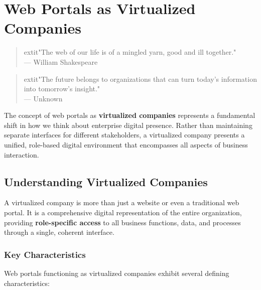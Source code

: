 
\chapter{Web Portals as Virtualized Companies}
\label{chap:virtualized-companies}

\begin{quote}
	extit{"The web of our life is of a mingled yarn, good and ill together."} \\
— William Shakespeare
\end{quote}

\begin{quote}
	extit{"The future belongs to organizations that can turn today's information into tomorrow's insight."} \\
— Unknown
\end{quote}

The concept of web portals as \textbf{virtualized companies} represents a fundamental shift in how we think about enterprise digital presence. Rather than maintaining separate interfaces for different stakeholders, a virtualized company presents a unified, role-based digital environment that encompasses all aspects of business interaction.

\section{Understanding Virtualized Companies}
\label{sec:understanding-virtualized}

A virtualized company is more than just a website or even a traditional web portal. It is a comprehensive digital representation of the entire organization, providing \textbf{role-specific access} to all business functions, data, and processes through a single, coherent interface.

\subsection{Key Characteristics}

Web portals functioning as virtualized companies exhibit several defining characteristics:

